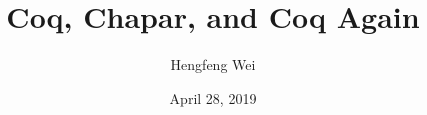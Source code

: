 \documentclass[]{beamer}
\title[Coq, Chapar, and Coq Again]{Coq, Chapar, and Coq Again}
\subtitle{}
\author[Hengfeng Wei]{Hengfeng Wei}
\institute{ICS, NJU}
\date{April 28, 2019}
\begin{document}
\renewcommand\figurename{} %
\renewcommand\tablename{}  %

\maketitle





\thankyou{}
\end{document}
